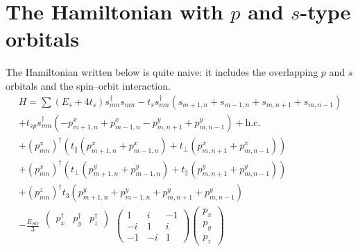 \documentclass{article}
\begin{document}
\section{The Hamiltonian with $p$ and $s$-type orbitals}
The Hamiltonian written below is quite naive: it includes the overlapping $p$ and $s$ orbitals
and the spin--orbit interaction.
\begin{multline}
   H  = \sum (E_s + 4t_s) s_{mn}^{\dagger} s_{mn} - t_s s_{mn}^{\dagger}
                          (s_{m+1,n} + s_{m-1,n} + s_{m,n+1} + s_{m,n-1}) \\
          + t_{sp} s_{mn}^{\dagger} (-p_{m+1,n}^x + p_{m-1,n}^x - p^y_{m,n+1} + p^y_{m,n-1})
                                                                + \mathrm{h.c.}  \\
          + (p_{mn}^x)^{\dagger}(t_{\parallel}(p_{m+1,n}^x + p_{m-1,n}^x) +
                                 t_{\perp} (p^x_{m,n+1} + p^x_{m,n-1})) \\
          + (p_{mn}^x)^{\dagger}(t_{\perp}(p_{m+1,n}^y + p_{m-1,n}^y) +
                                 t_{\parallel} (p^y_{m,n+1} + p^y_{m,n-1})) \\
          + (p_{mn}^z)^{\dagger} t_3 (p_{m+1,n}^y + p_{m-1,n}^y +
                                p^y_{m,n+1} + p^y_{m,n-1}) \\
          -\frac{E_{SO}}{3}
                \begin{matrix}
                    \left(\begin{matrix}
                        p_x^\dagger & p_y^\dagger & p_z^\dagger
                    \end{matrix}\right) \\
                    \\
                    \\
                \end{matrix}
        		\left(\begin{matrix}
        			1 & i & -1 \\
        			-i & 1 & i \\
        			-1 & -i & 1
        		\end{matrix} \right)
                \left(\begin{matrix}
                    p_x \\ 
                    p_y \\
                    p_z
                \end{matrix}\right)
\end{multline}
\end{document}
